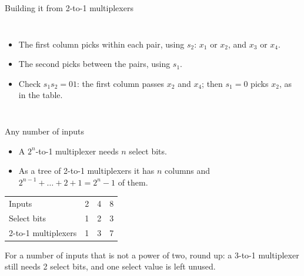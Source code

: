\documentclass[10pt]{wosm-slides}
\begin{document}
\begin{frame}{Building it from 2-to-1 multiplexers}
  \begin{columns}[c, totalwidth=\textwidth]
      \centering
      \begin{itemize}
        \item The first column picks within each pair, using $s_2$: $x_1$ or $x_2$,
          and $x_3$ or $x_4$.
        \item The second picks between the pairs, using $s_1$.
        \item Check $s_1 s_2 = 01$: the first column passes $x_2$ and $x_4$; then
          $s_1 = 0$ picks $x_2$, as in the table.
      \end{itemize}
  \end{columns}

  \medskip
\end{frame}

\begin{frame}{Any number of inputs}
  \begin{itemize}
    \item A $2^n$-to-1 multiplexer needs $n$ select bits.
    \item As a tree of 2-to-1 multiplexers it has $n$ columns and
      $2^{n-1} + \dots + 2 + 1 = 2^n - 1$ of them.
  \end{itemize}

  \begin{center}
    \begin{tabular}{@{}lccc@{}}
      \toprule
      Inputs & 2 & 4 & 8 \\
      Select bits & 1 & 2 & 3 \\
      2-to-1 multiplexers & 1 & 3 & 7 \\
      \bottomrule
    \end{tabular}
  \end{center}

  \begin{remark}
    For a number of inputs that is not a power of two, round up: a 3-to-1
    multiplexer still needs 2 select bits, and one select value is left unused.
  \end{remark}
\end{frame}
\end{document}
